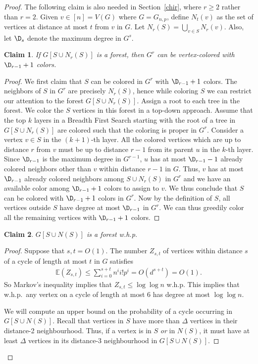\documentclass[12pt,a4paper]{article}
\newtheorem{claim}{Claim}
\def\E{\mathbb{E}}
\newcommand{\beq}[2]{\begin{align}\label{#1}#2\end{align}}
\def\Dr{\D_{r-1}}
\theoremstyle{plain}
\begin{document}
\begin{proof}
 The following claim is also needed in Section~\ref{chir}, where $r\geq 2$ rather than $r=2$. Given $v\in[n]=V(G)$ where $G =  G_{n,p}$, define $N_t(v)$ as the set of vertices at distance at most $t$ from $v$ in $G$. Let $N_r(S) = \bigcup\limits_{v\in S} N_r(v)$. Also, let $\D_{s}$ denote the maximum degree in $G^s$.
\begin{claim}\label{claim:chr}
	If $G[S\cup N_r(S)]$ is a forest, then $G^r$ can be vertex-colored with $\Dr+1$ colors. 
	\end{claim}
\begin{proof}
	We first claim that $S$ can be colored in $G^r$ with $\Dr+1$ colors. The neighbors of $S$ in $G^r$ are precisely $N_r(S)$, hence while coloring $S$ we can restrict our attention to the forest $G[S\cup N_r(S)]$. Assign a root to each tree in the forest. We color the $S$ vertices in this forest in a top-down approach. Assume that the top $k$ layers in a Breadth First Search starting with the root of a tree in $G[S\cup N_r(S)]$ are colored such that the coloring is proper in $G^r$. Consider a vertex $v\in S$ in the $(k+1)$-th layer. All the colored vertices which are up to distance $r$ from $v$ must be up to distance $r-1$ from its parent $u$ in the $k$-th layer. Since $\Dr$ is the maximum degree in $G^{r-1}$, $u$ has at most $\Dr-1$ already colored neighbors other than $v$ within distance $r-1$ in $G$. Thus, $v$ has at most $\Dr$ already colored neighbors among $S\cup N_r(S)$ in $G^r$ and we have an available color among $\Dr+1$ colors to assign to $v$. We thus conclude that $S$ can be colored with $\Dr+1$ colors in $G^r$. Now by the definition of $S$, all vertices outside $S$ have degree at most $\Dr$ in $G^r$. We can thus greedily color all the remaining vertices with $\Dr+1$ colors.
\end{proof}
\begin{claim}\label{claim:forest}
    $G[S \cup N(S)]$ is a forest w.h.p.
\end{claim}
\begin{proof}
Suppose that $s,t=O(1)$. The number $Z_{s,t}$ of vertices within distance $s$ of a cycle of length at most $t$ in $G$ satisfies 
\beq{Zst}{
\E(Z_{s,t})\leq \sum_{i=0}^{s+t}n^ii!p^i =O(d^{s+t})=O(1).
}
\noindent So Markov's inequality implies that $Z_{s,t}\leq \log \log n$ w.h.p. This implies that w.h.p.~any vertex on a cycle of length at most 6 has degree at most $\log\log n$.

We will compute an upper bound on the probability of a cycle occurring in $G[S \cup N(S)]$. Recall that vertices in $S$ have more than $\Delta$ vertices in their distance-2 neighbourhood. Thus, if a vertex is in $S$ \emph{or} in $N(S)$, it must have at least $\Delta$ vertices in its distance-3 neighbourhood in $G[S \cup N(S)]$.



\end{proof}
\end{proof}
\end{document}
